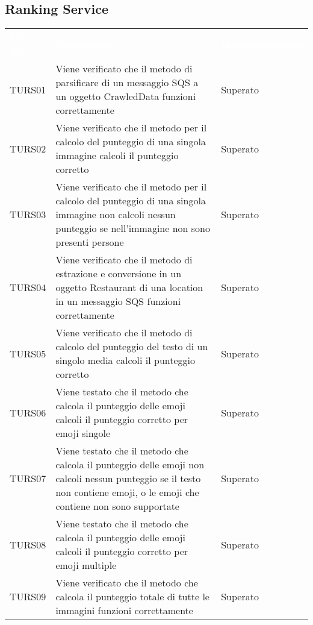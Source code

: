 \subsection{Ranking Service}
\renewcommand{\arraystretch}{1.5}
\begin{longtable}{ m{}<{\centering}  m{}<{\centering}  m{}<{\centering} }
	\rowcolor{darkblue}
	\textcolor{white}{\textbf{ID Test}} &\textcolor{white}{\textbf{Descrizione}} & \textcolor{white}{\textbf{Implementazione}} \\ 

	TURS01 & Viene verificato che il metodo di parsificare di un messaggio SQS a un oggetto CrawledData funzioni correttamente & Superato \\
   
    TURS02 & Viene verificato che il metodo per il calcolo del punteggio di una singola immagine calcoli il punteggio corretto & Superato \\
    
	TURS03 & Viene verificato che il metodo per il calcolo del punteggio di una singola immagine non calcoli nessun punteggio se nell'immagine non sono presenti persone & Superato \\
    
    TURS04 & Viene verificato che il metodo di estrazione e conversione in un oggetto Restaurant di una location in un messaggio SQS funzioni correttamente & Superato \\
   
    TURS05 & Viene verificato che il metodo di calcolo del punteggio del testo di un singolo media calcoli il punteggio corretto & Superato \\

    TURS06 & Viene testato che il metodo che calcola il punteggio delle emoji calcoli il punteggio corretto per emoji singole & Superato \\

    TURS07 & Viene testato che il metodo che calcola il punteggio delle emoji non calcoli nessun punteggio se il testo non contiene emoji, o le emoji che contiene non sono supportate & Superato \\

    TURS08 & Viene testato che il metodo che calcola il punteggio delle emoji calcoli il punteggio corretto per emoji multiple & Superato \\
    
    TURS09 & Viene verificato che il metodo che calcola il punteggio totale di tutte le immagini funzioni correttamente & Superato \\


\end{longtable}
